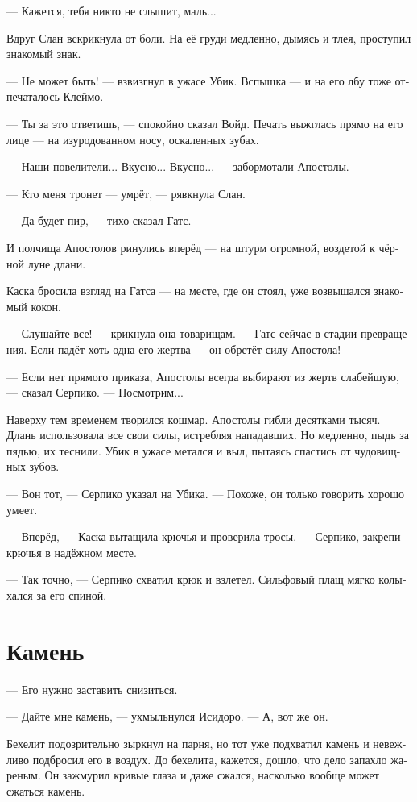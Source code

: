 \documentclass[a4paper,12pt,fleqn]{book}\usepackage{polyglossia}\setdefaultlanguage[babelshorthands=true]{russian}\setotherlanguage{english}\defaultfontfeatures{Ligatures=TeX,Mapping=tex-text}\usepackage{xcolor}\newcommand{\ml}[3]{#2}
\begin{document}
--- Кажется, тебя никто не слышит, маль...

Вдруг Слан вскрикнула от боли.
На её груди медленно, дымясь и тлея, проступил знакомый знак.

--- Не может быть! --- взвизгнул в ужасе Убик.
Вспышка --- и на его лбу тоже отпечаталось Клеймо.

--- Ты за это ответишь, --- спокойно сказал Войд.
Печать выжглась прямо на его лице --- на изуродованном носу, оскаленных зубах.

--- Наши повелители...
Вкусно...
Вкусно... --- забормотали Апостолы.

--- Кто меня тронет --- умрёт, --- рявкнула Слан.

--- Да будет пир, --- тихо сказал Гатс.

И полчища Апостолов ринулись вперёд --- на штурм огромной, воздетой к чёрной луне длани.

Каска бросила взгляд на Гатса --- на месте, где он стоял, уже возвышался знакомый кокон.

--- Слушайте все! --- крикнула она товарищам.
--- Гатс сейчас в стадии превращения.
Если падёт хоть одна его жертва --- он обретёт силу Апостола!

--- Если нет прямого приказа, Апостолы всегда выбирают из жертв слабейшую, --- сказал Серпико.
--- Посмотрим...

Наверху тем временем творился кошмар.
Апостолы гибли десятками тысяч.
Длань использовала все свои силы, истребляя нападавших.
Но медленно, пыдь за пядью, их теснили.
Убик в ужасе метался и выл, пытаясь спастись от чудовищных зубов.

--- Вон тот, --- Серпико указал на Убика.
--- Похоже, он только говорить хорошо умеет.

--- Вперёд, --- Каска вытащила крючья и проверила тросы.
--- Серпико, закрепи крючья в надёжном месте.

--- Так точно, --- Серпико схватил крюк и взлетел.
Сильфовый плащ мягко колыхался за его спиной.

\section{Камень}

--- Его нужно заставить снизиться.

--- Дайте мне камень, --- ухмыльнулся Исидоро.
--- А, вот же он.

Бехелит подозрительно зыркнул на парня, но тот уже подхватил камень и невежливо подбросил его в воздух.
До бехелита, кажется, дошло, что дело запахло жареным.
Он зажмурил кривые глаза и даже сжался, насколько вообще может сжаться камень.
\end{document}
